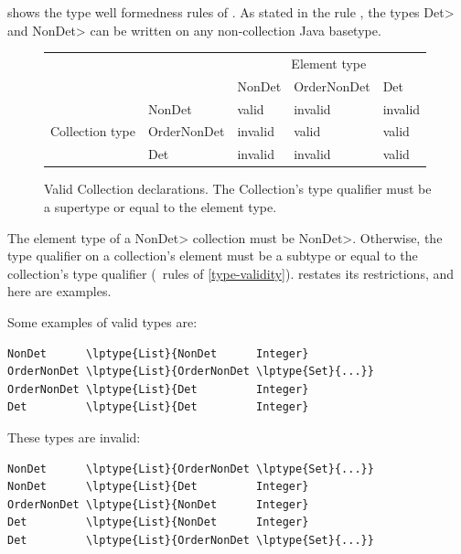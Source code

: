  shows the type well formedness
rules of \ourTypeSystem. 
As stated in the rule , the types \<Det> and \<NonDet>
can be written on any non-collection Java basetype.

\begin{figure}
    \centering
    \begin{tabular}{|l|l|l|l|l|}
        \cline{3-5}
        \multicolumn{2}{c|}{~}  &  \multicolumn{3}{c|}{Element type} \\ \cline{3-5}
        \multicolumn{2}{c|}{~}  & NonDet     & OrderNonDet & Det \\ \hline
                        & NonDet      &  valid     &  invalid    & invalid  \\ \cline{2-5}
        Collection type & OrderNonDet &  invalid   &  valid      & valid    \\ \cline{2-5}
                        & Det         &  invalid   &  invalid    & valid    \\ \hline
    \end{tabular}
    \caption{Valid Collection declarations.  The Collection's type qualifier
        must be a supertype or equal to the element type.}
    \label{fig:determinism-collections}
\end{figure}

The element type of a \<NonDet> collection must be \<NonDet>.
Otherwise, the type qualifier on a collection's element must be a subtype or equal to
the collection's type qualifier (\ rules of
\cref{type-validity}).
 restates its restrictions, and here are examples.

\smallskip
\noindent
\begin{minipage}{.48\textwidth}
Some examples of valid types are:
\begin{smaller}
\begin{Verbatim}[commandchars=\\\{\}]
NonDet      \lptype{List}{NonDet      Integer}
OrderNonDet \lptype{List}{OrderNonDet \lptype{Set}{...}}
OrderNonDet \lptype{List}{Det         Integer}
Det         \lptype{List}{Det         Integer}

\end{Verbatim}
\end{smaller}
\end{minipage}
\hfill
\begin{minipage}{.46\textwidth}
These types are invalid:
\begin{smaller}
\begin{Verbatim}[commandchars=\\\{\}]
NonDet      \lptype{List}{OrderNonDet \lptype{Set}{...}}
NonDet      \lptype{List}{Det         Integer}
OrderNonDet \lptype{List}{NonDet      Integer}
Det         \lptype{List}{NonDet      Integer}
Det         \lptype{List}{OrderNonDet \lptype{Set}{...}}
\end{Verbatim}
\end{smaller}
\end{minipage}
\smallskip


